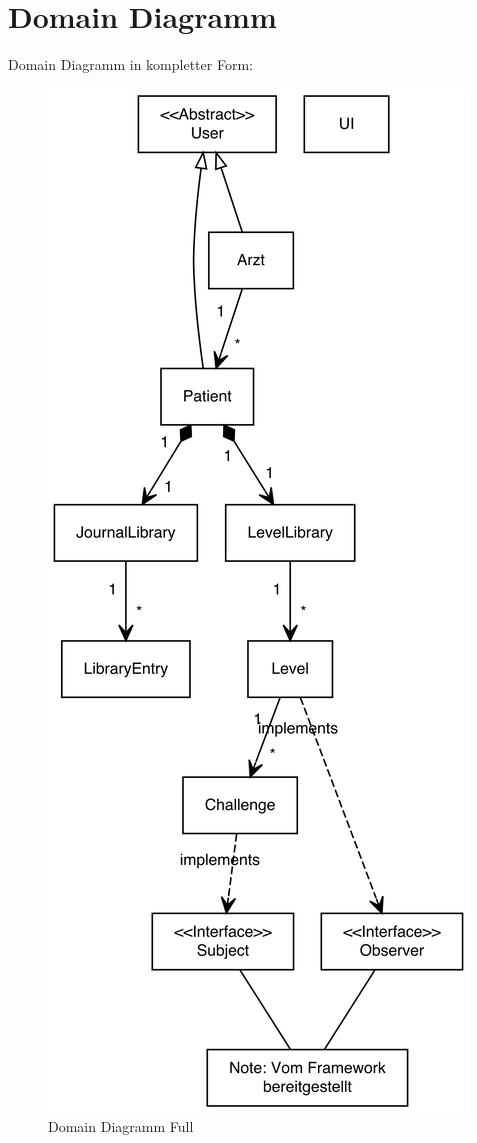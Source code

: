 \chapter{Domain Diagramm}
Domain Diagramm in kompletter Form:
\begin{figure}[H]
\centering
\includegraphics[width=\textwidth,height=.7\textheight,keepaspectratio]{../DomainDiagramms/Full.png}
\caption{Domain Diagramm Full}
\end{figure}

